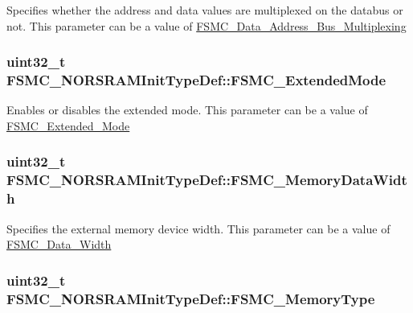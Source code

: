 \label{structFSMC__NORSRAMInitTypeDef_af4ff95085d3bb39e34c2f88ca3140ce5}
Specifies whether the address and data values are multiplexed on the databus or not. This parameter can be a value of \hyperlink{group__FSMC__Data__Address__Bus__Multiplexing}{FSMC\_\-Data\_\-Address\_\-Bus\_\-Multiplexing} \hypertarget{structFSMC__NORSRAMInitTypeDef_af33d0076b5bfea3a66e388ed7f3eb3f3}{
\subsubsection[{FSMC\_\-ExtendedMode}]{\setlength{\rightskip}{0pt plus 5cm}uint32\_\-t {\bf FSMC\_\-NORSRAMInitTypeDef::FSMC\_\-ExtendedMode}}}
\label{structFSMC__NORSRAMInitTypeDef_af33d0076b5bfea3a66e388ed7f3eb3f3}
Enables or disables the extended mode. This parameter can be a value of \hyperlink{group__FSMC__Extended__Mode}{FSMC\_\-Extended\_\-Mode} \hypertarget{structFSMC__NORSRAMInitTypeDef_a1791c771ff86f5dc5422040409517e9d}{
\subsubsection[{FSMC\_\-MemoryDataWidth}]{\setlength{\rightskip}{0pt plus 5cm}uint32\_\-t {\bf FSMC\_\-NORSRAMInitTypeDef::FSMC\_\-MemoryDataWidth}}}
\label{structFSMC__NORSRAMInitTypeDef_a1791c771ff86f5dc5422040409517e9d}
Specifies the external memory device width. This parameter can be a value of \hyperlink{group__FSMC__Data__Width}{FSMC\_\-Data\_\-Width} \hypertarget{structFSMC__NORSRAMInitTypeDef_a979ad605c6a63923e060576ee01e888d}{
\subsubsection[{FSMC\_\-MemoryType}]{\setlength{\rightskip}{0pt plus 5cm}uint32\_\-t {\bf FSMC\_\-NORSRAMInitTypeDef::FSMC\_\-MemoryType}}}
\label{structFSMC__NORSRAMInitTypeDef_a979ad605c6a63923e060576ee01e888d}
